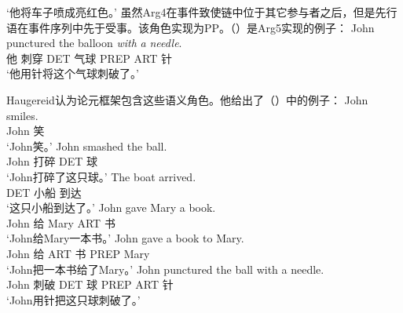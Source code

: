 \begin{exe}
\begin{xlist}[iv.]
\begin{exe}
\begin{xlist}[iv.]
\glt `他将车子喷成亮红色。'
\zl
虽然Arg4在事件致使链中位于其它参与者之后，但是先行语在事件序列中先于受事。该角色实现为PP。（）是Arg5实现的例子：
\ea
\gll John punctured the balloon \emph{with} \emph{a} \emph{needle}.\\
     他 刺穿 DET 气球 PREP ART 针\\
\glt `他用针将这个气球刺破了。'
\z

\noindent
Haugereid认为论元框架包含这些语义角色。他给出了（）中的例子：
\eal
\settowidth{}
\ex 
\gll John smiles.           \\
     John 笑\\
\glt `John笑。'
\ex 
\gll John smashed the ball. \\
     John 打碎 DET 球\\
\glt `John打碎了这只球。'
\ex 
\gll The boat arrived.      \\
     DET 小船 到达\\
\glt `这只小船到达了。'
\ex
\gll John gave Mary a book. \\
     John 给 Mary ART 书\\
\glt `John给Mary一本书。'
\ex 
\gll John gave a book to Mary. \\
     John 给 ART 书 PREP Mary\\
\glt `John把一本书给了Mary。'
\ex
\gll John punctured the ball with a needle. \\
     John 刺破 DET 球 PREP ART 针\\
\glt `John用针把这只球刺破了。' 
\zl


\end{xlist}
\end{exe}
\end{xlist}
\end{exe}
